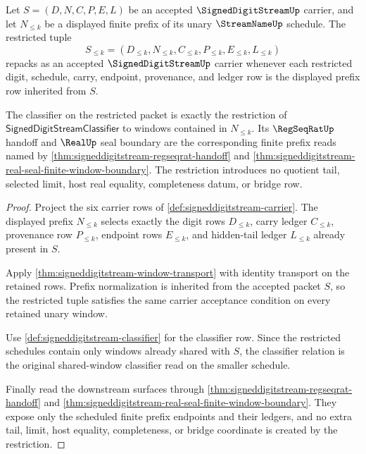 \begin{theorem}
\label{thm:signeddigitstream-prefix-truncation-stability}
Let $S=(D,N,C,P,E,L)$ be an accepted $\SignedDigitStreamUp$ carrier, and let $N_{\leq k}$ be a displayed finite prefix of its unary $\StreamNameUp$ schedule. The restricted tuple
$$
S_{\leq k}=(D_{\leq k},N_{\leq k},C_{\leq k},P_{\leq k},E_{\leq k},L_{\leq k})
$$
repacks as an accepted $\SignedDigitStreamUp$ carrier whenever each restricted digit, schedule, carry, endpoint, provenance, and ledger row is the displayed prefix row inherited from $S$.

The classifier on the restricted packet is exactly the restriction of $\mathsf{SignedDigitStreamClassifier}$ to windows contained in $N_{\leq k}$. Its $\RegSeqRatUp$ handoff and $\RealUp$ seal boundary are the corresponding finite prefix reads named by \autoref{thm:signeddigitstream-regseqrat-handoff} and \autoref{thm:signeddigitstream-real-seal-finite-window-boundary}. The restriction introduces no quotient tail, selected limit, host real equality, completeness datum, or bridge row.
\end{theorem}
\begin{proof}
Project the six carrier rows of \autoref{def:signeddigitstream-carrier}. The displayed prefix $N_{\leq k}$ selects exactly the digit rows $D_{\leq k}$, carry ledger $C_{\leq k}$, provenance row $P_{\leq k}$, endpoint rows $E_{\leq k}$, and hidden-tail ledger $L_{\leq k}$ already present in $S$.

Apply \autoref{thm:signeddigitstream-window-transport} with identity transport on the retained rows. Prefix normalization is inherited from the accepted packet $S$, so the restricted tuple satisfies the same carrier acceptance condition on every retained unary window.

Use \autoref{def:signeddigitstream-classifier} for the classifier row. Since the restricted schedules contain only windows already shared with $S$, the classifier relation is the original shared-window classifier read on the smaller schedule.

Finally read the downstream surfaces through \autoref{thm:signeddigitstream-regseqrat-handoff} and \autoref{thm:signeddigitstream-real-seal-finite-window-boundary}. They expose only the scheduled finite prefix endpoints and their ledgers, and no extra tail, limit, host equality, completeness, or bridge coordinate is created by the restriction.
\end{proof}

